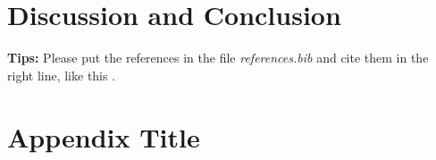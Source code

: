\documentclass{article}
\begin{document}

\section{Discussion and Conclusion}\label{sec:dis&res}


    
    
 
 \textbf{Tips:} Please put the references in the file \emph{references.bib} and cite them in the right line, like this \cite{hadash2018estimate}.

\appendix
\section{Appendix Title}
\label{app:f18-runningtime}



\label{app:f23-runningtime}



  
  
\end{document}
